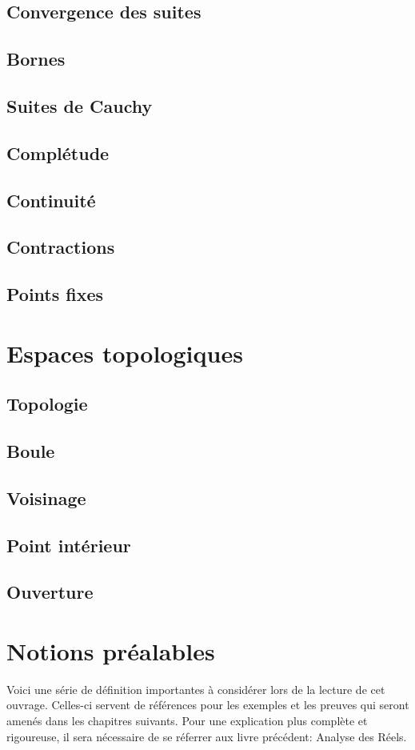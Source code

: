 \documentclass[12pt]{book}
\theoremstyle{definition}
\begin{document}
\section{Convergence des suites}
\section{Bornes}
\section{Suites de Cauchy}
\section{Complétude}
\section{Continuité}
\section{Contractions}
\section{Points fixes}


\chapter{Espaces topologiques}
\section{Topologie}
\section{Boule}
\section{Voisinage}
\section{Point intérieur}
\section{Ouverture}


\appendix
\chapter{Notions préalables}
Voici une série de définition importantes à considérer lors de la lecture de cet ouvrage. Celles-ci servent
de références pour les exemples et les preuves qui seront amenés dans les chapitres suivants. Pour une explication
plus complète et rigoureuse, il sera nécessaire de se réferrer aux livre précédent: Analyse des Réels.
\end{document}
